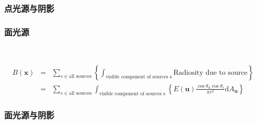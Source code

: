 \documentclass{beamer}
\newcommand{\mathd}{\mathrm{d}}
\newcommand{\tmmathbf}[1]{\ensuremath{\boldsymbol{#1}}}
\begin{document}
{{\begin{frame}
  \frametitle{点光源与阴影}
  
  \qquad{}
\end{frame}

\begin{frame}
  \frametitle{面光源}
  
  \
  
  
  \begin{eqnarray*}
    B (\tmmathbf{x}) & = & \sum_{s \in \text{all sources}} \left\{
    \int_{\text{visible component of sources s}} \text{Radiosity due to
    source} \right\}\\
    & = & \sum_{s \in \text{all sources}} \int_{\text{visible component of
    sources s}} \text{} \left\{ E (\tmmathbf{u}) \frac{\cos \theta_u \cos
    \theta_s}{\pi r^2} \mathd A_{\tmmathbf{u}} \right\}
  \end{eqnarray*}
\end{frame}

\begin{frame}
  \frametitle{面光源与阴影}
  
  {\hspace{4em}}
\end{frame}

}}
\end{document}
